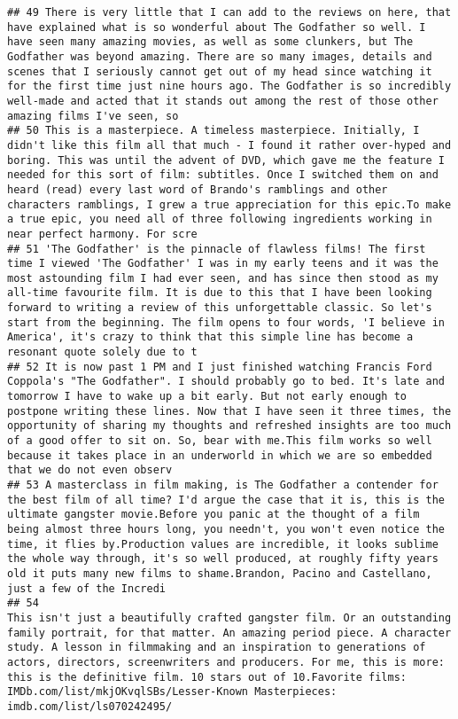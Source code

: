 \documentclass[
]{article}
\begin{document}
\begin{verbatim}
## 49 There is very little that I can add to the reviews on here, that have explained what is so wonderful about The Godfather so well. I have seen many amazing movies, as well as some clunkers, but The Godfather was beyond amazing. There are so many images, details and scenes that I seriously cannot get out of my head since watching it for the first time just nine hours ago. The Godfather is so incredibly well-made and acted that it stands out among the rest of those other amazing films I've seen, so
## 50 This is a masterpiece. A timeless masterpiece. Initially, I didn't like this film all that much - I found it rather over-hyped and boring. This was until the advent of DVD, which gave me the feature I needed for this sort of film: subtitles. Once I switched them on and heard (read) every last word of Brando's ramblings and other characters ramblings, I grew a true appreciation for this epic.To make a true epic, you need all of three following ingredients working in near perfect harmony. For scre
## 51 'The Godfather' is the pinnacle of flawless films! The first time I viewed 'The Godfather' I was in my early teens and it was the most astounding film I had ever seen, and has since then stood as my all-time favourite film. It is due to this that I have been looking forward to writing a review of this unforgettable classic. So let's start from the beginning. The film opens to four words, 'I believe in America', it's crazy to think that this simple line has become a resonant quote solely due to t
## 52 It is now past 1 PM and I just finished watching Francis Ford Coppola's "The Godfather". I should probably go to bed. It's late and tomorrow I have to wake up a bit early. But not early enough to postpone writing these lines. Now that I have seen it three times, the opportunity of sharing my thoughts and refreshed insights are too much of a good offer to sit on. So, bear with me.This film works so well because it takes place in an underworld in which we are so embedded that we do not even observ
## 53 A masterclass in film making, is The Godfather a contender for the best film of all time? I'd argue the case that it is, this is the ultimate gangster movie.Before you panic at the thought of a film being almost three hours long, you needn't, you won't even notice the time, it flies by.Production values are incredible, it looks sublime the whole way through, it's so well produced, at roughly fifty years old it puts many new films to shame.Brandon, Pacino and Castellano, just a few of the Incredi
## 54                                                                               This isn't just a beautifully crafted gangster film. Or an outstanding family portrait, for that matter. An amazing period piece. A character study. A lesson in filmmaking and an inspiration to generations of actors, directors, screenwriters and producers. For me, this is more: this is the definitive film. 10 stars out of 10.Favorite films: IMDb.com/list/mkjOKvqlSBs/Lesser-Known Masterpieces: imdb.com/list/ls070242495/

\end{verbatim}
\end{document}
